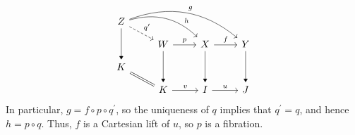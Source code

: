 \begin{solution}
\begin{equation*}
\begin{tikzcd}[row sep=small]
Z \arrow[rd, dashed, "q^\prime"] \arrow[rrd, bend left, near end, "h"] \arrow[rrrd, bend left, "g"] \arrow[dd, -Triangle] \\
& W \arrow[r, "p"] & X \arrow[r, "f"] & Y \\
K \arrow[rd, equal] \\
& K \arrow[r, "v"] & I \arrow[r, "u"] & J
\arrow[from=uull, to=ll, -Triangle, crossing over]
\arrow[from=uul, to=l, -Triangle, crossing over]
\arrow[from=uu, -Triangle, crossing over]
\end{tikzcd}
\end{equation*}
In particular, \(g = f \circ p \circ q^\prime\), so the uniqueness of \(q\) implies that \(q^\prime = q\), and hence \(h = p \circ q\).
Thus, \(f\) is a Cartesian lift of \(u\), so \(p\) is a fibration.
\end{solution}